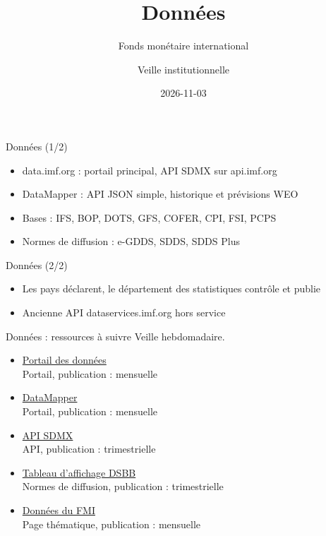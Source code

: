 \documentclass[aspectratio=169,11pt]{beamer}
\title{Données}
\subtitle{Fonds monétaire international}
\author{Veille institutionnelle}
\date{2026-11-03}
\begin{document}
\begin{frame}\titlepage\end{frame}

\begin{frame}{Données (1/2)}
\begin{itemize}
\item data.imf.org : portail principal, API SDMX sur api.imf.org
\item DataMapper : API JSON simple, historique et prévisions WEO
\item Bases : IFS, BOP, DOTS, GFS, COFER, CPI, FSI, PCPS
\item Normes de diffusion : e-GDDS, SDDS, SDDS Plus
\end{itemize}
\end{frame}

\begin{frame}{Données (2/2)}
\begin{itemize}
\item Les pays déclarent, le département des statistiques contrôle et publie
\item Ancienne API dataservices.imf.org hors service
\end{itemize}
\end{frame}

\begin{frame}{Données : ressources à suivre}
\small
Veille hebdomadaire.
\begin{itemize}
\item \href{https://data.imf.org}{Portail des données}\\{\footnotesize Portail, publication : mensuelle}
\item \href{https://www.imf.org/external/datamapper}{DataMapper}\\{\footnotesize Portail, publication : mensuelle}
\item \href{https://api.imf.org/external/sdmx/2.1/dataflow}{API SDMX}\\{\footnotesize API, publication : trimestrielle}
\item \href{https://dsbb.imf.org}{Tableau d'affichage DSBB}\\{\footnotesize Normes de diffusion, publication : trimestrielle}
\item \href{https://www.imf.org/en/Data}{Données du FMI}\\{\footnotesize Page thématique, publication : mensuelle}
\end{itemize}
\end{frame}
\end{document}
